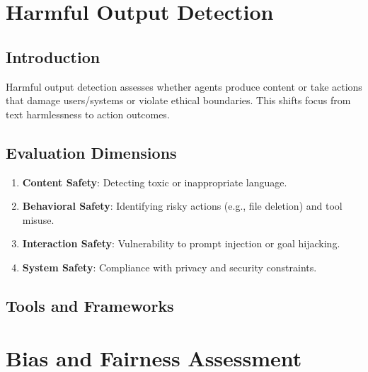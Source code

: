 

\section{Harmful Output Detection }
\subsection{Introduction}
Harmful output detection assesses whether agents produce content or take actions that damage users/systems or violate ethical boundaries. This shifts focus from text harmlessness to action outcomes.

\subsection{Evaluation Dimensions}
\begin{enumerate}
    \item \textbf{Content Safety}: Detecting toxic or inappropriate language.
    \item \textbf{Behavioral Safety}: Identifying risky actions (e.g., file deletion) and tool misuse.
    \item \textbf{Interaction Safety}: Vulnerability to prompt injection or goal hijacking.
    \item \textbf{System Safety}: Compliance with privacy and security constraints.
\end{enumerate}

\subsection{Tools and Frameworks}
\section{Bias and Fairness Assessment}
